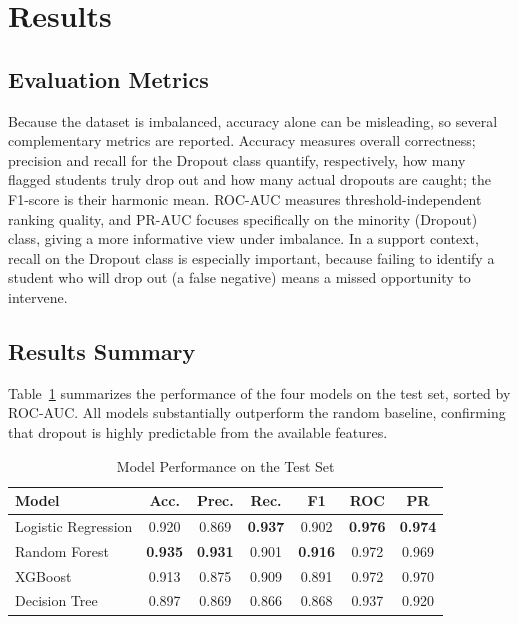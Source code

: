 \documentclass[conference]{IEEEtran}
\begin{document}
	\section{Results}
	\label{sec:results}
	
	\subsection{Evaluation Metrics}
	Because the dataset is imbalanced, accuracy alone can be misleading, so several complementary metrics are reported. Accuracy measures overall correctness; precision and recall for the Dropout class quantify, respectively, how many flagged students truly drop out and how many actual dropouts are caught; the F1-score is their harmonic mean. ROC-AUC measures threshold-independent ranking quality, and PR-AUC focuses specifically on the minority (Dropout) class, giving a more informative view under imbalance. In a support context, recall on the Dropout class is especially important, because failing to identify a student who will drop out (a false negative) means a missed opportunity to intervene.
	
	\subsection{Results Summary}
	Table~\ref{tab:results} summarizes the performance of the four models on the test set, sorted by ROC-AUC. All models substantially outperform the random baseline, confirming that dropout is highly predictable from the available features.
	
	\begin{table}[htbp]
		\caption{Model Performance on the Test Set}
		\begin{center}
			\setlength{\tabcolsep}{3pt}
			\begin{tabular}{|l|c|c|c|c|c|c|}
				\hline
				\textbf{Model} & \textbf{Acc.} & \textbf{Prec.} & \textbf{Rec.} & \textbf{F1} & \textbf{ROC} & \textbf{PR} \\
				\hline
				Logistic Regression & 0.920 & 0.869 & \textbf{0.937} & 0.902 & \textbf{0.976} & \textbf{0.974} \\
				\hline
				Random Forest & \textbf{0.935} & \textbf{0.931} & 0.901 & \textbf{0.916} & 0.972 & 0.969 \\
				\hline
				XGBoost & 0.913 & 0.875 & 0.909 & 0.891 & 0.972 & 0.970 \\
				\hline
				Decision Tree & 0.897 & 0.869 & 0.866 & 0.868 & 0.937 & 0.920 \\
				\hline
			\end{tabular}
			\label{tab:results}
		\end{center}
	\end{table}
	
\end{document}
